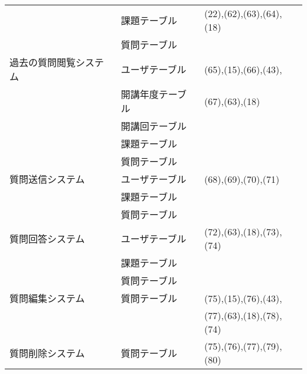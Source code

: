 \begin{table}[H]
\begin{tabular}{|l|l|l|}
                  & 課題テーブル &(22),(62),(63),(64),(18) \\ \cline{2-2}
                  & 質問テーブル & \\ \hline
    過去の質問閲覧システム & ユーザテーブル & (65),(15),(66),(43),\\ \cline{2-2}
                        & 開講年度テーブル & (67),(63),(18)\\ \cline{2-2}
                        & 開講回テーブル  & \\ \cline{2-2}
                        & 課題テーブル & \\ \cline{2-2}
                        & 質問テーブル & \\ \hline
    質問送信システム & ユーザテーブル & (68),(69),(70),(71)\\ \cline{2-2}
                  & 課題テーブル & \\ \cline{2-2}
                  & 質問テーブル & \\ \hline
    質問回答システム & ユーザテーブル & (72),(63),(18),(73),(74)\\ \cline{2-2}
                  & 課題テーブル & \\ \cline{2-2}
                  & 質問テーブル & \\ \hline
    質問編集システム & 質問テーブル & (75),(15),(76),(43),\\ \cline{2-2}
		              & & (77),(63),(18),(78),(74)\\ \hline
    質問削除システム & 質問テーブル & (75),(76),(77),(79),(80)\\ \hline
		\end{tabular}
	\end{table}
